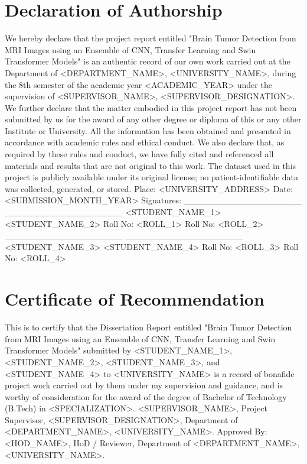 \documentclass[12pt,a4paper,oneside]{report}
\begin{document}
\chapter*{Declaration of Authorship}
We hereby declare that the project report entitled "Brain Tumor Detection from MRI Images using an Ensemble of CNN, Transfer Learning and Swin Transformer Models" is an authentic record of our own work carried out at the Department of <DEPARTMENT\_NAME>, <UNIVERSITY\_NAME>, during the 8th semester of the academic year <ACADEMIC\_YEAR> under the supervision of <SUPERVISOR\_NAME>, <SUPERVISOR\_DESIGNATION>.
We further declare that the matter embodied in this project report has not been submitted by us for the award of any other degree or diploma of this or any other Institute or University. All the information has been obtained and presented in accordance with academic rules and ethical conduct. We also declare that, as required by these rules and conduct, we have fully cited and referenced all materials and results that are not original to this work. The dataset used in this project is publicly available under its original license; no patient-identifiable data was collected, generated, or stored.
Place: <UNIVERSITY\_ADDRESS>
Date: <SUBMISSION\_MONTH\_YEAR>
Signatures:
\_\_\_\_\_\_\_\_\_\_\_\_\_\_\_\_\_\_\_          \_\_\_\_\_\_\_\_\_\_\_\_\_\_\_\_\_\_\_
<STUDENT\_NAME\_1>              <STUDENT\_NAME\_2>
Roll No: <ROLL\_1>              Roll No: <ROLL\_2>
\_\_\_\_\_\_\_\_\_\_\_\_\_\_\_\_\_\_\_          \_\_\_\_\_\_\_\_\_\_\_\_\_\_\_\_\_\_\_
<STUDENT\_NAME\_3>              <STUDENT\_NAME\_4>
Roll No: <ROLL\_3>              Roll No: <ROLL\_4>
\chapter*{Certificate of Recommendation}
This is to certify that the Dissertation Report entitled "Brain Tumor Detection from MRI Images using an Ensemble of CNN, Transfer Learning and Swin Transformer Models" submitted by <STUDENT\_NAME\_1>, <STUDENT\_NAME\_2>, <STUDENT\_NAME\_3>, and <STUDENT\_NAME\_4> to <UNIVERSITY\_NAME> is a record of bonafide project work carried out by them under my supervision and guidance, and is worthy of consideration for the award of the degree of Bachelor of Technology (B.Tech) in <SPECIALIZATION>.
<SUPERVISOR\_NAME>,
Project Supervisor,
<SUPERVISOR\_DESIGNATION>, Department of <DEPARTMENT\_NAME>,
<UNIVERSITY\_NAME>.
Approved By:
<HOD\_NAME>,
HoD / Reviewer, Department of <DEPARTMENT\_NAME>,
<UNIVERSITY\_NAME>.
\end{document}
